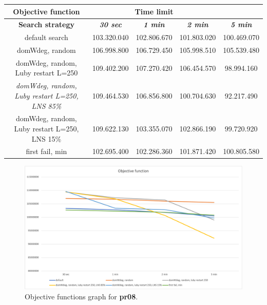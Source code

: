 {
\renewcommand{\arraystretch}{2}
\begin{longtable}[h]{| c | c | c | c | c |}
    \hline
    \textbf{Objective function} & \multicolumn{3}{c}{Time limit} & \\
    \hline
    \textbf{Search strategy} & \textbf{\textit{30 sec}} & \textbf{\textit{1 min}} & \textbf{\textit{2 min}} & \textbf{\textit{5 min}} \\
    \hline
    \endhead
    default search                                         & 103.320.040 & 102.806.670 & 101.803.020 & 100.469.070 \\
    \hline
    domWdeg, random                                        & 106.998.800 & 106.729.450 & 105.998.510 & 105.539.480 \\
    \hline
    domWdeg, random, Luby restart L=250                    & 109.402.200 & 107.270.420 & 106.454.570 &  98.994.160 \\
    \hline
    \textit{domWdeg, random, Luby restart L=250, LNS 85\%} & 109.464.530 & 106.856.800 & 100.704.630 &  92.217.490 \\
    \hline
    domWdeg, random, Luby restart L=250, LNS 15\%          & 109.622.130 & 103.355.070 & 102.866.190 &  99.720.920 \\
    \hline
    first fail, min                                        & 102.695.400 & 102.286.360 & 101.871.420 & 100.805.580 \\
    \hline
\end{longtable}
}
\begin{figure}[H]
    \centering
    \includegraphics[width=0.8\columnwidth]{../graphs/pr08-objf.png}
    \caption{Objective functions graph for \textbf{pr08}.}
\end{figure}

